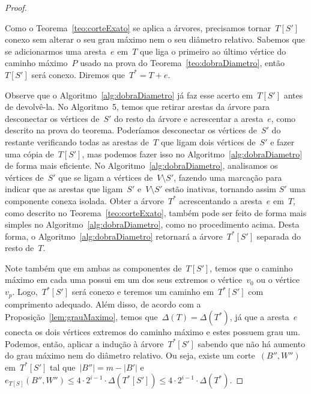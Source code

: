 \begin{proof}
\begin{center}
\begin{tikzpicture}
			\end{tikzpicture} \end{center}
			Como o Teorema~\ref{teo:corteExato} se aplica a 
			árvores, precisamos tornar~$T[S']$ conexo sem
			alterar o seu grau máximo nem o seu diâmetro relativo.
			Sabemos que se adicionarmos uma aresta~$e$ em~$T$ que 
			liga o primeiro ao último vértice do caminho máximo~$P$
			usado na prova do Teorema~\ref{teo:dobraDiametro},
			então~$T[S']$ será conexo. 
			Diremos que~${T^* = T+ e}$.

			Observe que o Algoritmo~\ref{alg:dobraDiametro} já faz
			esse acerto em~$T[S']$ antes de devolvê-la.
			No Algoritmo~5, temos que 
			retirar arestas da árvore para 
			desconectar os vértices de~$S'$ do resto da árvore
			e acrescentar a aresta~$e$, como descrito na prova do teorema.
			Poderíamos desconectar os vértices 
			de~$S'$ do restante
			verificando todas as arestas de~$T$ que 
			ligam dois vértices de~$S'$ e fazer uma cópia de~$T[S']$, mas podemos
			fazer isso no Algoritmo~\ref{alg:dobraDiametro} de forma 
			mais eficiente. 
			No Algoritmo~\ref{alg:dobraDiametro},
			analisamos os vértices de~$S'$ que se ligam a vértices 
			de~$V\setminus S'$, fazendo
			uma marcação para indicar que as 
			arestas que ligam~$S'$ e~${V\setminus S'}$ estão inativas, 
			tornando assim $S'$ uma componente conexa isolada. 
			Obter a árvore~$T^*$ acrescentando a aresta~$e$ em~$T$, como descrito no
			Teorema~\ref{teo:corteExato}, também pode ser feito de 
			forma mais simples no Algoritmo~\ref{alg:dobraDiametro},
			como no procedimento acima.
			Desta forma, o Algoritmo~\ref{alg:dobraDiametro} retornará
			a árvore~$T^*[S']$ separada do resto de~$T$.

			Note também que em ambas as componentes de~$T[S']$, 
			temos que o caminho máximo em cada uma possui em um dos
			seus extremos o vértice~$v_0$ ou o vértice~$v_p$.
			Logo,~$T^*[S']$ será conexo e 
			teremos um caminho
			em~$T^*[S']$ com comprimento adequado.
			Além disso, de acordo com a Proposição~\ref{lem:grauMaximo}, 
			temos que~${\Delta(T) = \Delta(T^*)}$, já que a aresta~$e$ 
			conecta os dois vértices extremos do caminho máximo
			e estes possuem grau um.
			Podemos, então, aplicar a indução à árvore~$T^*[S']$ 
			sabendo que não há aumento
			do grau máximo nem do diâmetro relativo.
			Ou seja,
			existe um corte~$(B'',W'')$ em~$T^*[S']$
			tal que~${|B''|=m-|B'|}$ 
			e~${e_{T[S]}(B'',W'')\le 4\cdot 2^{i-1}\cdot
			\Delta(T^*[S'])\le 4\cdot 2^{i-1}\cdot\Delta(T^*)}$.


\end{proof}
